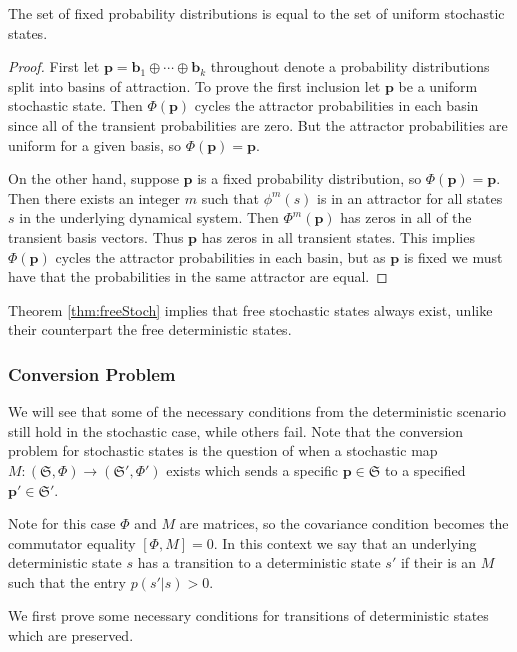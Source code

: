 \begin{thm}[label=thm:freeStoch]
    The set of fixed probability distributions is equal to the set of uniform stochastic states.
\end{thm}
\begin{proof}
    First let $\mathbf{p} = \mathbf{b}_1\oplus\cdots\oplus\mathbf{b}_k$ throughout denote a probability distributions split into basins of attraction. To prove the first inclusion let $\mathbf{p}$ be a uniform stochastic state. Then $\Phi(\mathbf{p})$ cycles the attractor probabilities in each basin since all of the transient probabilities are zero. But the attractor probabilities are uniform for a given basis, so $\Phi(\mathbf{p}) = \mathbf{p}$.


    On the other hand, suppose $\mathbf{p}$ is a fixed probability distribution, so $\Phi(\mathbf{p}) = \mathbf{p}$. Then there exists an integer $m$ such that $\phi^m(s)$ is in an attractor for all states $s$ in the underlying dynamical system. Then $\Phi^m(\mathbf{p})$ has zeros in all of the transient basis vectors. Thus $\mathbf{p}$ has zeros in all transient states. This implies $\Phi(\mathbf{p})$ cycles the attractor probabilities in each basin, but as $\mathbf{p}$ is fixed we must have that the probabilities in the same attractor are equal.
\end{proof}

Theorem \ref{thm:freeStoch} implies that free stochastic states always exist, unlike their counterpart the free deterministic states.


\subsubsection{Conversion Problem}


We will see that some of the necessary conditions from the deterministic scenario still hold in the stochastic case, while others fail. Note that the conversion problem for stochastic states is the question of when a stochastic map $M:(\mathfrak{S},\Phi)\rightarrow (\mathfrak{S}',\Phi')$ exists which sends a specific $\mathbf{p} \in \mathfrak{S}$ to a specified $\mathbf{p}' \in \mathfrak{S}'$.


Note for this case $\Phi$ and $M$ are matrices, so the covariance condition becomes the commutator equality $[\Phi,M] = 0$. In this context we say that an underlying deterministic state $s$ has a transition to a deterministic state $s'$ if their is an $M$ such that the entry $p(s'|s) > 0$. 

We first prove some necessary conditions for transitions of deterministic states which are preserved.



